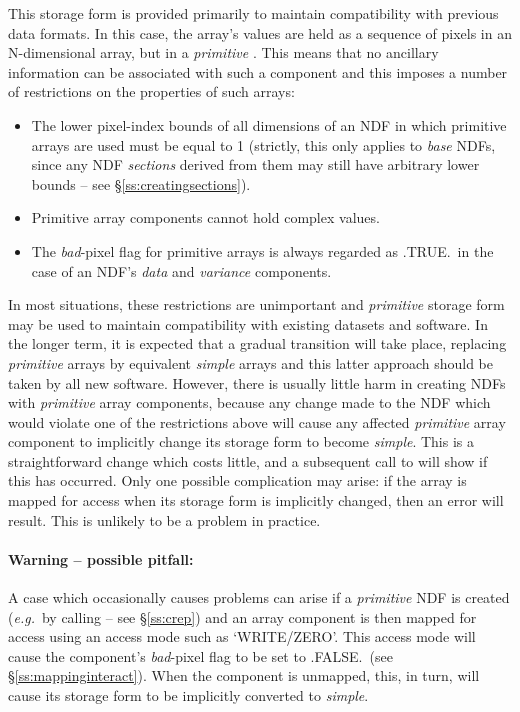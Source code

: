\documentclass[twoside,11pt,nolof]{starlink}
\providecommand{\st}[1]{{\emph{#1}}}
\begin{document}
This storage form is provided primarily to maintain compatibility with
previous data formats.
In this case, the array's values are held as a sequence of pixels in an
N-dimensional array, but in a \st{primitive\/} .
This means that no ancillary information can be associated with such a
component and this imposes a number of restrictions on the properties of
such arrays:

\begin{itemize}

\item
The lower pixel-index bounds of all dimensions of an NDF in which primitive
arrays are used must be equal to 1 (strictly, this only applies to \st{base\/} NDFs, since any NDF \st{sections\/} derived from them may still have
arbitrary lower bounds -- see \S\ref{ss:creatingsections}).

\item
Primitive array components cannot hold complex values.

\item
The \st{bad\/}-pixel flag for primitive arrays is always regarded as
.TRUE.\ in the case of an NDF's \st{data\/} and \st{variance\/}
components.

\end{itemize}

In most situations, these restrictions are unimportant and \st{primitive\/}
storage form may be used to maintain compatibility with existing datasets
and software.
In the longer term, it is expected that a gradual transition will take
place, replacing \st{primitive\/} arrays by equivalent \st{simple\/} arrays
and this latter approach should be taken by all new software.
However, there is usually little harm in creating NDFs with
\st{primitive\/} array components, because any change made to the NDF
which
would violate one of the restrictions above will cause any affected
\st{primitive\/} array component to implicitly change its storage form
to become
\st{simple}.
This is a straightforward change which costs little, and a subsequent call
to  will show if this has occurred.
Only one possible complication may arise: if the array is mapped for access
when its storage form is implicitly changed, then an error will result.
This is unlikely to be a problem in practice.

\paragraph{Warning -- possible pitfall:} A case which occasionally causes
problems can arise if a \st{primitive\/} NDF is created (\st{e.g.}\ by
calling  -- see \S\ref{ss:crep}) and an array component is then
mapped for access using an access mode such as `WRITE/ZERO'.
This access mode will cause the component's \st{bad}-pixel flag to be set
to .FALSE.\ (see \S\ref{ss:mappinginteract}).
When the component is unmapped, this, in turn, will cause its storage form
to be implicitly converted to \st{simple}.
\end{document}
